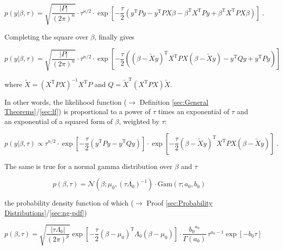 \documentclass[a4paper,12pt]{book}
\begin{document}
\begin{equation} \label{eq:blr-prior-GLM-LF-s2}
p(y|\beta,\tau) = \sqrt{\frac{|P|}{(2 \pi)^n}} \cdot \tau^{n/2} \cdot \exp\left[ -\frac{\tau}{2} \left( y^\mathrm{T} P y - y^\mathrm{T} P X \beta - \beta^\mathrm{T} X^\mathrm{T} P y + \beta^\mathrm{T} X^\mathrm{T} P X \beta \right) \right] \; .
\end{equation}

Completing the square over $\beta$, finally gives

\begin{equation} \label{eq:blr-prior-GLM-LF-s3}
p(y|\beta,\tau) = \sqrt{\frac{|P|}{(2 \pi)^n}} \cdot \tau^{n/2} \cdot \exp\left[ -\frac{\tau}{2} \left( (\beta - \tilde{X}y)^\mathrm{T} X^\mathrm{T} P X (\beta - \tilde{X}y) - y^\mathrm{T} Q y + y^\mathrm{T} P y \right) \right]
\end{equation}

where $\tilde{X} = \left( X^\mathrm{T} P X \right)^{-1} X^\mathrm{T} P$ and $Q = \tilde{X}^\mathrm{T} \left( X^\mathrm{T} P X \right) \tilde{X}$.

\vspace{1em}
In other words, the likelihood function ($\rightarrow$ Definition \ref{sec:General Theorems}/\ref{sec:lf}) is proportional to a power of $\tau$ times an exponential of $\tau$ and an exponential of a squared form of $\beta$, weighted by $\tau$:

\begin{equation} \label{eq:blr-prior-GLM-LF-s4}
p(y|\beta,\tau) \propto \tau^{n/2} \cdot \exp\left[ -\frac{\tau}{2} \left( y^\mathrm{T} P y - y^\mathrm{T} Q y \right) \right] \cdot \exp\left[ -\frac{\tau}{2} (\beta - \tilde{X}y)^\mathrm{T} X^\mathrm{T} P X (\beta - \tilde{X}y) \right] \; .
\end{equation}

The same is true for a normal gamma distribution over $\beta$ and $\tau$

\begin{equation} \label{eq:blr-prior-BLR-prior-s1}
p(\beta,\tau) = \mathcal{N}(\beta; \mu_0, (\tau \Lambda_0)^{-1}) \cdot \mathrm{Gam}(\tau; a_0, b_0)
\end{equation}

the probability density function of which ($\rightarrow$ Proof \ref{sec:Probability Distributions}/\ref{sec:ng-pdf})

\begin{equation} \label{eq:blr-prior-BLR-prior-s2}
p(\beta,\tau) = \sqrt{\frac{|\tau \Lambda_0|}{(2 \pi)^p}} \exp\left[ -\frac{\tau}{2} (\beta-\mu_0)^\mathrm{T} \Lambda_0 (\beta-\mu_0) \right] \cdot \frac{ {b_0}^{a_0}}{\Gamma(a_0)} \, \tau^{a_0-1} \exp[-b_0 \tau]
\end{equation}
\end{document}
